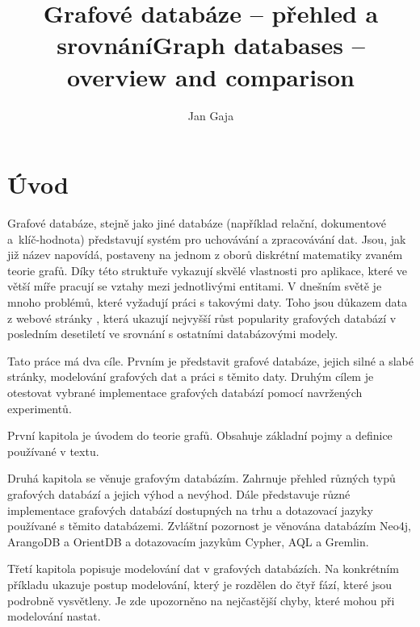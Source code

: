 \documentclass[
  program=infoi,
  biblatex=true,
  figures=true,
  glossaries=false,
  index,
  sourcecodes=true
]{kidiplom}
\title{Grafové databáze – přehled a srovnání}
\title[english]{Graph databases – overview and comparison}
\author{Jan Gaja}
\begin{document}
\maketitle



\newcommand{\BibLaTeX}{\textsc{Bib}\LaTeX}

\section*{Úvod}

Grafové databáze, stejně jako jiné databáze (například relační, dokumentové a~klíč-hodnota) představují systém pro uchovávání a zpracovávání dat. Jsou, jak již název napovídá, postaveny na jednom z oborů diskrétní matematiky zvaném teorie grafů. Díky této struktuře vykazují skvělé vlastnosti pro aplikace, které ve větší míře pracují se vztahy mezi jednotlivými entitami. V dnešním světě je mnoho problémů, které vyžadují práci s takovými daty. Toho jsou důkazem data z webové stránky \cite{dbEngines}, která ukazují nejvyšší růst popularity grafových databází v posledním desetiletí ve srovnání s ostatními databázovými modely.

Tato práce má dva cíle. Prvním je představit grafové databáze, jejich silné a slabé stránky, modelování grafových dat a práci s těmito daty. Druhým cílem je otestovat vybrané implementace grafových databází pomocí navržených experimentů.

První kapitola je úvodem do teorie grafů. Obsahuje základní pojmy a definice používané v textu.

Druhá kapitola se věnuje grafovým databázím. Zahrnuje přehled různých typů grafových databází a jejich výhod a nevýhod. Dále představuje různé implementace grafových databází dostupných na trhu a dotazovací jazyky používané s těmito databázemi. Zvláštní pozornost je věnována databázím Neo4j, ArangoDB a OrientDB a dotazovacím jazykům Cypher, AQL a Gremlin.

Třetí kapitola popisuje modelování dat v grafových databázích. Na konkrétním příkladu ukazuje postup modelování, který je rozdělen do čtyř fází, které jsou podrobně vysvětleny. Je zde upozorněno na nejčastější chyby, které mohou při modelování nastat.
\end{document}
